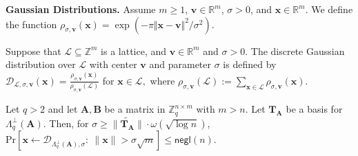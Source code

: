 \documentclass[runningheads,10pt]{llncs}
\def\ZZ{\mathbb{Z}}
\def\RR{\mathbb{R}}
\def\cal{\mathcal}
\def\bf{\mathbf}
\def\Pr{\mathrm{Pr}}
\def\x{\bf{x}}
\def\Lp{\Lambda^{\perp}}
\begin{document}
\noindent\textbf{Gaussian Distributions.}  
Assume $m\geq 1$, $\mathbf{v}\in \mathbb{R}^m$, $\sigma>0$, and  $\mathbf{x}\in \mathbb{R}^m$.
We define  the function $\rho_{\sigma,\mathbf{v}}(\mathbf{x})= \exp({{-\pi \Vert \mathbf{x}-\mathbf{v}\Vert^2 }/{ \sigma^2}})$. 
\begin{definition}\label{def12}
	Suppose that $\mathcal{L}\subseteq\ZZ^m$ is  a lattice, and  $\mathbf{v}\in\RR^m$ and $\sigma>0$. 
	The discrete Gaussian distribution over $\mathcal{L}$ with center $\mathbf{v}$ and parameter $\sigma$ is defined by
	$\cal{D}_{\mathcal{L},\sigma,\mathbf{v}}(\mathbf{x})=\frac{\rho_{\sigma,\mathbf{v}}(\mathbf{x})}{\rho_{\sigma,\mathbf{v}}(\mathcal{L})}$ 
	for $\mathbf{x}\in\mathcal{L},$ where  $ 	\rho_{\sigma,\mathbf{v}}(\mathcal{L}):=\sum_{\x\in\mathcal{L}}\rho_{\sigma,\mathbf{v}}(\x).$
\end{definition}

\begin{lemma}[{\cite[Lemma 4.4]{MR04}}]\label{thm:Gauss}
	Let $q> 2$ and let $\mathbf{A},\mathbf{B}$ be a matrix in $\ZZ_q^{n\times m}$ with $m>n$. Let $\mathbf{T}_\mathbf{A}$  
	be a basis for  $\Lp_q(\mathbf{A})$. Then, for $\sigma\geq\|\widetilde{\mathbf{T}_\mathbf{A}}\|\cdot  \omega(\sqrt{\log n})$, 
	$\Pr[\x\gets \mathcal{D}_{\Lambda_q^{\bot}(\mathbf{A}),\sigma}:~\|\x\|>\sigma\sqrt{m}]\leq\mathsf{negl}(n).$
\end{lemma}

\iffalse
\begin{lemma}[{\cite[Lemma 4.3]{Lyu12}}] \label{lem2}  For any $\mathbf{v} \in \mathbb{R}^m$, and any $\sigma, r>0$,  $$\Pr[|\mathbf{z}^T\mathbf{v}| >r, \mathbf{z }\leftarrow \mathcal{D}_{\mathbb{Z}^m,\sigma}] \leq 2 e^{\frac{-r^2}{2\| \mathbf{v}\|^2\sigma^2}}.$$
\end{lemma}
\begin{lemma}[{ \cite[Lemma 4.4]{Lyu12}}] \label{lem2}  For any $k>0$, $$\Pr[|z| >k\sigma, z \leftarrow \mathcal{D}_{\mathbb{Z},\sigma}] \leq 2 e^{\frac{-k^2}{2}}.$$
\end{lemma}
\fi
\end{document}
